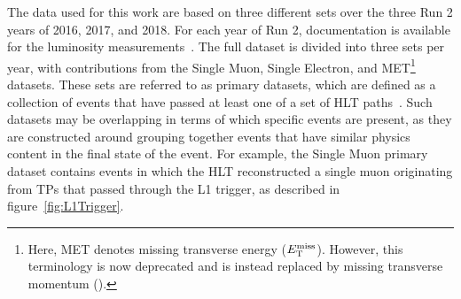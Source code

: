 The data used for this work are based on three different sets over the three Run 2 years of 2016, 2017, and 2018.
For each year of Run 2, documentation is available for the luminosity measurements~\cite{CMS-PAS-LUM-17-001,CMS-PAS-LUM-17-004,CMS-PAS-LUM-18-002}.
The full dataset is divided into three sets per year, with contributions from the Single Muon, Single Electron, and MET\footnote{Here, MET denotes missing transverse energy ($E_\mathrm{T}^\mathrm{miss}$). However, this terminology is now deprecated and is instead replaced by missing transverse momentum (\ptmiss).} datasets.
These sets are referred to as primary datasets, which are defined as a collection of events that have passed at least one of a set of HLT paths~\cite{Franzoni2016}.
Such datasets may be overlapping in terms of which specific events are present, as they are constructed around grouping together events that have similar physics content in the final state of the event.
For example, the Single Muon primary dataset contains events in which the HLT reconstructed a single muon originating from TPs that passed through the L1 trigger, as described in figure~\ref{fig:L1Trigger}.


